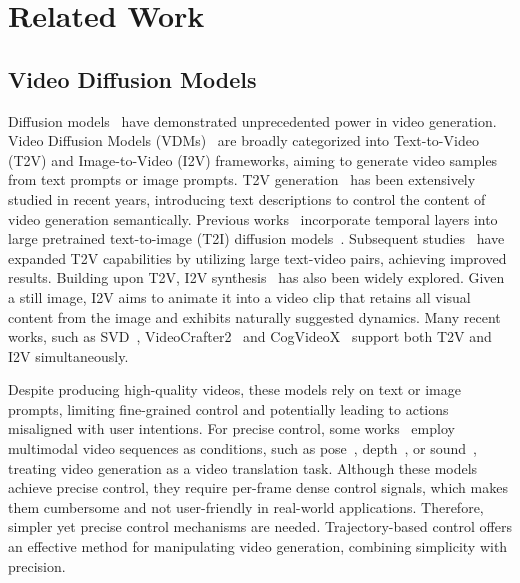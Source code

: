 \section{Related Work}\label{sec:related}

\subsection{Video Diffusion Models}

Diffusion models~\cite{first_diffusion, ddpm, ddim} have demonstrated unprecedented power in video generation. Video Diffusion Models (VDMs)~\cite{vdm} are broadly categorized into Text-to-Video (T2V) and Image-to-Video (I2V) frameworks, aiming to generate video samples from text prompts or image prompts. T2V generation~\cite{align_your_latents, videocrafter_1, dreamix, make_a_video, SVD, phenaki, tune_a_video, cogvideo, cogvideox, khachatryan2023, ge2023, animatediff} has been extensively studied in recent years, introducing text descriptions to control the content of video generation semantically. Previous works~\cite{align_your_latents, lvdm, modelscope, lavie, magicvideo, animatediff} incorporate temporal layers into large pretrained text-to-image (T2I) diffusion models~\cite{rombach2022}. Subsequent studies~\cite{align_your_latents, SVD, cogvideox, opensora, opensora_plan} have expanded T2V capabilities by utilizing large text-video pairs, achieving improved results. Building upon T2V, I2V synthesis~\cite{i2vgen_xl, SVD, cogvideox, opensora, videocrafter2, dynamicrafter, liu2024dynamic} has also been widely explored. Given a still image, I2V aims to animate it into a video clip that retains all visual content from the image and exhibits naturally suggested dynamics. Many recent works, such as SVD~\cite{SVD}, VideoCrafter2~\cite{videocrafter2} and CogVideoX~\cite{cogvideox} support both T2V and I2V simultaneously.


Despite producing high-quality videos, these models rely on text or image prompts, limiting fine-grained control and potentially leading to actions misaligned with user intentions. For precise control, some works~\cite{hu2024animate,huang2024lvcd,wang2024framer,zhu2024zero,xu2024magicanimate,ma2024follow,qin2023dancing,zhang2024mimicmotion,xing2023make,zhu2024champ,jeong2023tpos,zhang2025motion} employ multimodal video sequences as conditions, such as pose~\cite{zhu2024zero,xu2024magicanimate,hu2024animate,ma2024follow,qin2023dancing,zhang2024mimicmotion}, depth~\cite{xing2023make,he2023animate,zhu2024champ}, or sound~\cite{jeong2023tpos,lee2023aadiff,liu2023generative,tian2024emo}, treating video generation as a video translation task. Although these models achieve precise control, they require per-frame dense control signals, which makes them cumbersome and not user-friendly in real-world applications. Therefore, simpler yet precise control mechanisms are needed. Trajectory-based control offers an effective method for manipulating video generation, combining simplicity with precision.


